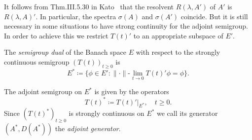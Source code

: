 It follows from Thm.III.5.30 in Kato~\cite{kato:1966} that the resolvent $R(\lambda,A')$ of $A'$ is $R(\lambda,A)'$.
In particular, the spectra $\sigma(A)$ and $\sigma(A')$ coincide.
But it is still necessary in some situations to have strong continuity for the adjoint semigroup.
In order to achieve this we restrict $T(t)'$ to an appropriate subspace of $E'$.

\begin{definition}\label{def:a1-3.1}
The \emph{semigroup dual} of the Banach space $E$ with respect to the strongly continuous semigroup $(T(t))_{t \geq 0}$ is
\[
    E^{*} \coloneqq \{\phi \in E': \|\cdot\|\text{-}\lim_{t \to 0} T(t)'\phi = \phi\}.
\]


\newpage

The adjoint semigroup on $E^{*}$ is given by the operators
\[
    T(t)^{*} \coloneqq T(t)'|_{E^{*}}, \quad t \geq 0.
\]
Since $(T(t)^{*})_{t \geq 0}$ is strongly continuous on $E^{*}$ we call its generator $(A^{*},D(A^{*}))$ the \emph{adjoint generator}.
\end{definition}

